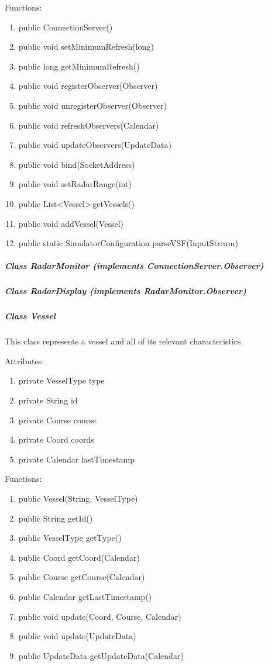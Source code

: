 \documentclass{article}
\begin{document}
Functions:
\begin{enumerate}
	\item public ConnectionServer()
	\item public void setMinimumRefresh(long)
	\item public long getMinimumRefresh()
	\item public void registerObserver(Observer)
	\item public void unregisterObserver(Observer)
	\item public void refreshObservers(Calendar)
	\item public void updateObservers(UpdateData)
	\item public void bind(SocketAddress)
	\item public void setRadarRange(int)
	\item public List\textless Vessel\textgreater \,getVessels()
	\item public void addVessel(Vessel)
	\item public static SimulatorConfiguration parseVSF(InputStream)
\end{enumerate}

\subparagraph{Class RadarMonitor (implements ConnectionServer.Observer)} %

\subparagraph{Class RadarDisplay (implements RadarMonitor.Observer)} %

\subparagraph{Class Vessel}
This class represents a vessel and all of its relevant characteristics.

Attributes:
\begin{enumerate}
	\item private VesselType type
    \item private String id
    \item private Course course
    \item private Coord coords
    \item private Calendar lastTimestamp
\end {enumerate}

Functions:
\begin{enumerate}
	\item public Vessel(String, VesselType)
	\item public String getId()
	\item public VesselType getType()
	\item public Coord getCoord(Calendar)
	\item public Course getCourse(Calendar)
	\item public Calendar getLastTimestamp()
	\item public void update(Coord, Course, Calendar)
	\item public void update(UpdateData)
	\item public UpdateData getUpdateData(Calendar)
\end{enumerate}
\end{document}
